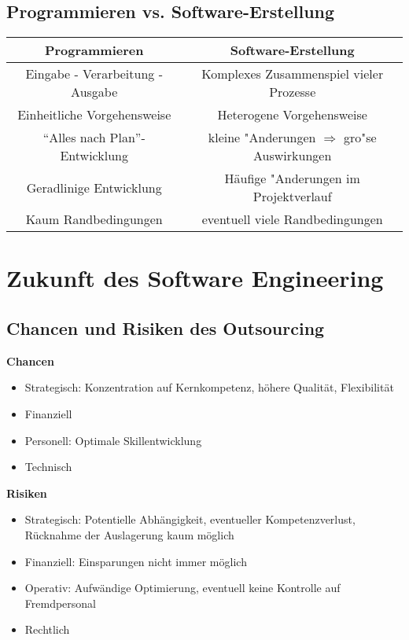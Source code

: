 \documentclass[a4paper,12pt]{article}
\begin{document}
\subsection*{Programmieren vs. Software-Erstellung}
\begin{table}[H]
	
	\begin{tabular}{c|c}
		\hline
		Programmieren & Software-Erstellung \\ \hline \hline
		Eingabe - Verarbeitung - Ausgabe & Komplexes Zusammenspiel vieler Prozesse\\ \hline
		Einheitliche Vorgehensweise & Heterogene Vorgehensweise \\ \hline
		"`Alles nach Plan"'-Entwicklung & kleine "Anderungen $\Rightarrow$ gro"se Auswirkungen\\ \hline
		Geradlinige Entwicklung & Häufige "Anderungen im Projektverlauf \\ \hline
		Kaum Randbedingungen & eventuell viele Randbedingungen
	\end{tabular}
\end{table}
\section{Zukunft des Software Engineering}
\subsection*{Chancen und Risiken des Outsourcing}
\textbf{Chancen}
\begin{itemize}
	\item Strategisch: Konzentration auf Kernkompetenz, höhere Qualität, Flexibilität
	\item Finanziell
	\item Personell: Optimale Skillentwicklung
	\item Technisch
\end{itemize}
\textbf{Risiken}
\begin{itemize}
	\item Strategisch: Potentielle Abhängigkeit, eventueller Kompetenzverlust, Rücknahme der Auslagerung kaum möglich
	\item Finanziell: Einsparungen nicht immer möglich
	\item Operativ: Aufwändige Optimierung, eventuell keine Kontrolle auf Fremdpersonal
	\item Rechtlich
\end{itemize}
\end{document}
